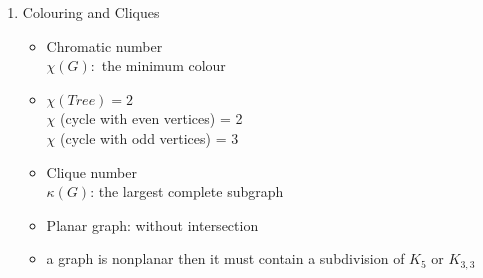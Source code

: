 \documentclass[11pt, a4paper]{article}
\begin{document}
\begin{multicols}{3}
\begin{enumerate}
        \item Colouring and Cliques
            \begin{itemize}
                \item Chromatic number\\
                    $\chi (G):$ the minimum colour
                \item $\chi (Tree) = 2$\\
                    $\chi$ (cycle with even vertices) = 2\\
                    $\chi$ (cycle with odd vertices) = 3
                \item Clique number\\
                    $ \kappa (G) $: the largest complete subgraph
                \item Planar graph: without intersection
                \item a graph is nonplanar then it must contain a subdivision of $K_5$ or $K_{3,3}$
            \end{itemize}
    \end{enumerate}


\end{multicols}
\end{document}
